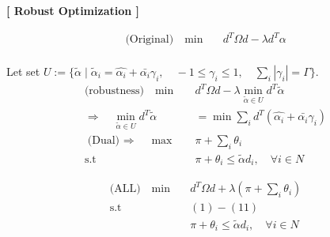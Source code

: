 \documentclass[11pt]{article}
\begin{document}
	
\centering\large \textbf{[ Robust Optimization ]}
	
	\begin{align*}
	\text{(Original)} \quad \min  \quad & d^T\Omega d  - \lambda d^T \alpha 
	\end{align*}
	\\
	Let set $U := \{ \tilde \alpha  \mid \tilde \alpha_i = \hat{\alpha_i} + \bar{\alpha_i}\gamma_i , \quad -1 \leq \gamma_i\leq 1 , \quad \sum_{i} |\gamma_i| = \Gamma \}$.
	\\
	\begin{align*}
	\text{(robustness)} \quad \min \quad & d^T\Omega d  - \lambda \min_{\tilde \alpha \in U } d^T \tilde{\alpha} \\
	\text{$\Rightarrow$} \quad \min_{\tilde \alpha \in U } d^T \tilde{\alpha} &= \min \sum_{i} d^T (\hat{\alpha_i} + \bar{\alpha_i}\gamma_i ) \\
	\text{(Dual) $\Rightarrow$} \quad \max \quad & \pi + \sum_{i} \theta_i  \\
	\text{s.t} \quad & \pi + \theta_i \leq   \tilde{\alpha} d_i, \quad \forall i \in N 
	\end{align*}
	
	\begin{align*}
	\text{(ALL)} \quad \min \quad & d^T\Omega d  +  \lambda (\pi + \sum_{i} \theta_i  ) \\
	\text{s.t } \quad & (1) - (11)\\
	&\pi + \theta_i \leq   \tilde{\alpha} d_i, \quad \forall i \in N 
	\end{align*}
	
\end{document}
